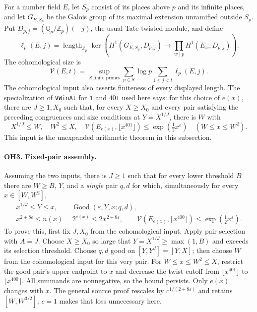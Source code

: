 For a number field $E$, let $S_p$ consist of its places above $p$ and its
infinite places, and let $G_{E,S_p}$ be the Galois group of its maximal
extension unramified outside $S_p$. Put
$D_{p,j}=(\mathbb Q_p/\mathbb Z_p)(-j)$, the usual Tate-twisted module, and define
\[
\ell_p(E,j)=\operatorname{length}_{\mathbb Z_p}\ker\left(
H^1(G_{E,S_p},D_{p,j})\longrightarrow\prod_{w\mid p}H^1(E_w,D_{p,j})\right).
\]
The cohomological size is
\[
 \mathcal V(E,t)=\sup_{S\text{ finite primes}}
       \sum_{p\in S}\log p\sum_{1\le j<t}\ell_p(E,j).
\]
The cohomological input also asserts finiteness of every displayed length.
The specialization of \texttt{VWinAt} for $\mathbf1$ and $401$ used here says:
for this choice of $e(x)$, there are $J\ge1,X_0$ such that, for every
$X\ge X_0$ and every pair satisfying the preceding congruences and size
conditions at $Y=X^{1/J}$, there is $W$ with
\[
 X^{1/J}\le W,\quad W^2\le X,\quad
 \mathcal V(E_{e(x)},\lfloor x^{401}\rfloor)
       \le \exp(\tfrac12x^\varepsilon)\quad(W\le x\le W^2).
\]
This input is the unexpanded arithmetic theorem in this subsection.

\paragraph{OH3. Fixed-pair assembly.}
Assuming the two inputs, there is $J\ge1$ such that for every lower
threshold $B$ there are $W\ge B$, $Y$, and a \emph{single} pair $q,d$ for
which, simultaneously for every $x\in[W,W^2]$,
\[
 \begin{gathered}
 x^{1/J}\le Y\le x,\qquad \operatorname{Good}(\varepsilon,Y,x;q,d),\\
 x^{2+8\varepsilon}\le n(x)=2^{e(x)}\le2x^{2+8\varepsilon},\qquad
 \mathcal V(E_{e(x)},\lfloor x^{400}\rfloor)
       \le\exp(\tfrac12x^\varepsilon).
 \end{gathered}
\]
To prove this, first fix $J,X_0$ from the cohomological input.  Apply pair
selection with $A=J$.  Choose $X\ge X_0$ so large that
$Y=X^{1/J}\ge\max(1,B)$ and exceeds its selection threshold.  Choose
$q,d$ good on $[Y,Y^J]=[Y,X]$; then choose $W$ from the cohomological
input for this very pair.  For $W\le x\le W^2\le X$, restrict the good
pair's upper endpoint to $x$ and decrease the twist cutoff from
$\lfloor x^{401}\rfloor$ to $\lfloor x^{400}\rfloor$.
All summands are nonnegative, so the bound persists.  Only $e(x)$ changes
with $x$.  The general source proof rescales by $c^{1/(2+8\varepsilon)}$
and retains $[W,W^{3/2}]$; $c=1$ makes that loss unnecessary here.

